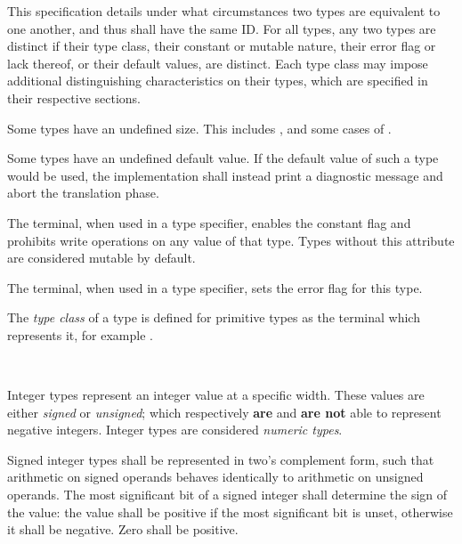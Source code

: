 This specification details under what circumstances two types are equivalent to
one another, and thus shall have the same ID. For all types, any two types are
distinct if their type class, their constant or mutable nature, their error
flag or lack thereof, or their default values, are distinct. Each type class
may impose additional distinguishing characteristics on their types, which are
specified in their respective sections.

\specsubitem
Some types have an undefined size. This includes ,
and some cases of .

\specsubitem
Some types have an undefined default value. If the default value of such a type
would be used, the implementation shall instead print a diagnostic message and
abort the translation phase.

\specsubitem
The  terminal, when used in a type specifier, enables the
constant flag and prohibits write operations on any value of that type. Types
without this attribute are considered mutable by default.

\specsubitem
The \terminal{!} terminal, when used in a type specifier, sets the
error flag for this type.

\specsubitem
The \textit{type class} of a type is defined for primitive types as the terminal
which represents it, for example .


\begin{grammar}
\oneof \\
\end{grammar}

\specsubsubitem
Integer types represent an integer value at a specific width. These values are
either \textit{signed} or \textit{unsigned}; which respectively \textbf{are} and
\textbf{are not} able to represent negative integers. Integer types are
considered \textit{numeric types}.

\specsubsubitem
Signed integer types shall be represented in two's complement form, such that
arithmetic on signed operands behaves identically to arithmetic on unsigned
operands. The most significant bit of a signed integer shall determine the sign
of the value: the value shall be positive if the most significant bit is unset,
otherwise it shall be negative. Zero shall be positive.

